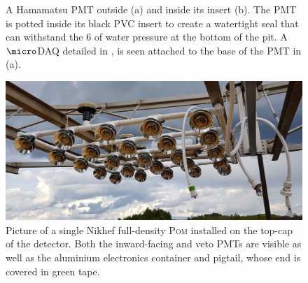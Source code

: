 \begin{figure} %
    \centering
    \quad
    \caption[Pictures of the Madison PMT assembly]
    {A Hamamatsu PMT outside (a) and inside its insert (b). The PMT is potted inside its black PVC
        insert to create a watertight seal that can withstand the \SI{6}{} of water
        pressure at the bottom of the pit. A $\micro$DAQ detailed in , is
        seen attached to the base of the PMT in (a).}
    \label{fig:madison_pmt_assembly}
\end{figure}

\begin{figure} %
    \includegraphics[width=\textwidth]{diagrams/4-chips/single_plane.pdf}
    \caption[Picture of a Nikhef \textsc{Pom}]
    {Picture of a single Nikhef full-density \textsc{Pom} installed on the top-cap of the
        \chipsfive detector. Both the inward-facing and veto PMTs are visible as well as the
        aluminium electronics container and pigtail, whose end is covered in green tape.}
    \label{fig:single_plane}
\end{figure}

